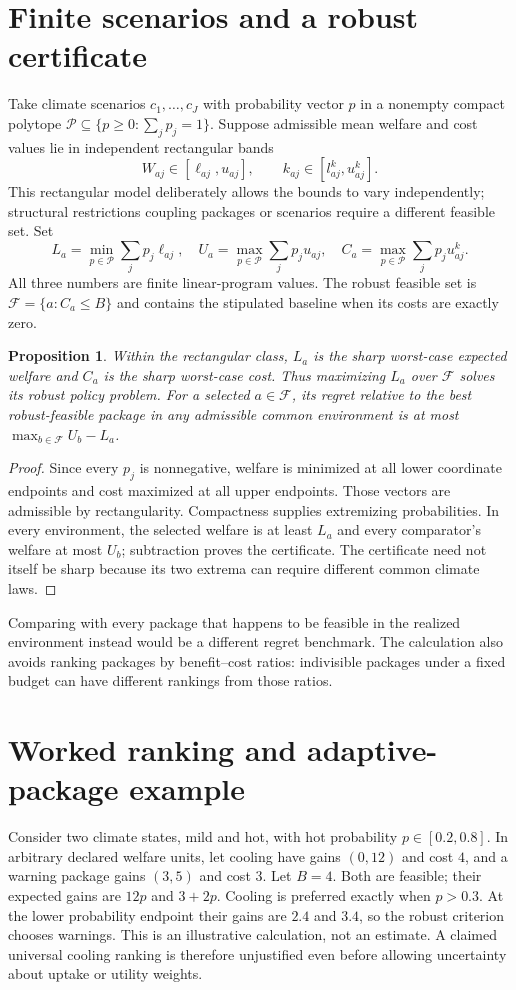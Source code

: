 \documentclass[11pt,a4paper]{article}
\newtheorem{proposition}[theorem]{Proposition}
\begin{document}
\section{Finite scenarios and a robust certificate}
Take climate scenarios $c_1,\ldots,c_J$ with probability vector $p$ in a nonempty compact polytope $\mathcal P\subseteq\{p\ge0:\sum_jp_j=1\}$. Suppose admissible mean welfare and cost values lie in independent rectangular bands
\[
 W_{aj}\in[\ell_{aj},u_{aj}],\qquad k_{aj}\in[l^k_{aj},u^k_{aj}].
\]
This rectangular model deliberately allows the bounds to vary independently; structural restrictions coupling packages or scenarios require a different feasible set. Set
\[
 L_a=\min_{p\in\mathcal P}\sum_jp_j\ell_{aj},\quad
 U_a=\max_{p\in\mathcal P}\sum_jp_ju_{aj},\quad
 C_a=\max_{p\in\mathcal P}\sum_jp_ju^k_{aj}.
\]
All three numbers are finite linear-program values. The robust feasible set is $\mathcal F=\{a:C_a\le B\}$ and contains the stipulated baseline when its costs are exactly zero.
\begin{proposition}
Within the rectangular class, $L_a$ is the sharp worst-case expected welfare and $C_a$ is the sharp worst-case cost. Thus maximizing $L_a$ over $\mathcal F$ solves its robust policy problem. For a selected $a\in\mathcal F$, its regret relative to the best robust-feasible package in any admissible common environment is at most $\max_{b\in\mathcal F}U_b-L_a$.
\end{proposition}
\begin{proof}
Since every $p_j$ is nonnegative, welfare is minimized at all lower coordinate endpoints and cost maximized at all upper endpoints. Those vectors are admissible by rectangularity. Compactness supplies extremizing probabilities. In every environment, the selected welfare is at least $L_a$ and every comparator's welfare at most $U_b$; subtraction proves the certificate. The certificate need not itself be sharp because its two extrema can require different common climate laws.
\end{proof}
Comparing with every package that happens to be feasible in the realized environment instead would be a different regret benchmark. The calculation also avoids ranking packages by benefit--cost ratios: indivisible packages under a fixed budget can have different rankings from those ratios.

\section{Worked ranking and adaptive-package example}
Consider two climate states, mild and hot, with hot probability $p\in[0.2,0.8]$. In arbitrary declared welfare units, let cooling have gains $(0,12)$ and cost $4$, and a warning package gains $(3,5)$ and cost $3$. Let $B=4$. Both are feasible; their expected gains are $12p$ and $3+2p$. Cooling is preferred exactly when $p>0.3$. At the lower probability endpoint their gains are $2.4$ and $3.4$, so the robust criterion chooses warnings. This is an illustrative calculation, not an estimate. A claimed universal cooling ranking is therefore unjustified even before allowing uncertainty about uptake or utility weights.
\end{document}
